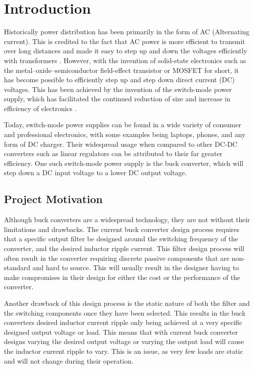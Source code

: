 \chapter{Introduction}\label{C:intro}

Historically power distribution has been primarily in the form of AC (Alternating current). This is credited to the fact that AC power is more efficient to transmit over long distances and made it easy to step up and down the voltages efficiently with transformers \cite{Earley2013}. However, with the invention of solid-state electronics such as the metal–oxide–semiconductor field-effect transistor or MOSFET for short, it has become possible to efficiently step up and step down direct current (DC) voltages. This has been achieved by the invention of the switch-mode power supply, which has facilitated the continued reduction of size and increase in efficiency of electronics \cite{Bocock}.

Today, switch-mode power supplies can be found in a wide variety of consumer and professional electronics, with some examples being laptops, phones, and any form of DC charger. Their widespread usage when compared to other DC-DC converters such as linear regulators can be attributed to their far greater efficiency. One such switch-mode power supply is the buck converter, which will step down a DC input voltage to a lower DC output voltage.

\section{Project Motivation}

Although buck converters are a widespread technology, they are not without their limitations and drawbacks. The current buck converter design process requires that a specific output filter be designed around the switching frequency of the converter, and the desired inductor ripple current. This filter design process will often result in the converter requiring discrete passive components that are non-standard and hard to source. This will usually result in the designer having to make compromises in their design for either the cost or the performance of the converter.

Another drawback of this design process is the static nature of both the filter and the switching components once they have been selected. This results in the buck converters desired inductor current ripple only being achieved at a very specific designed output voltage or load. This means that with current buck converter designs varying the desired output voltage or varying the output load will cause the inductor current ripple to vary. This is an issue, as very few loads are static and will not change during their operation. 


